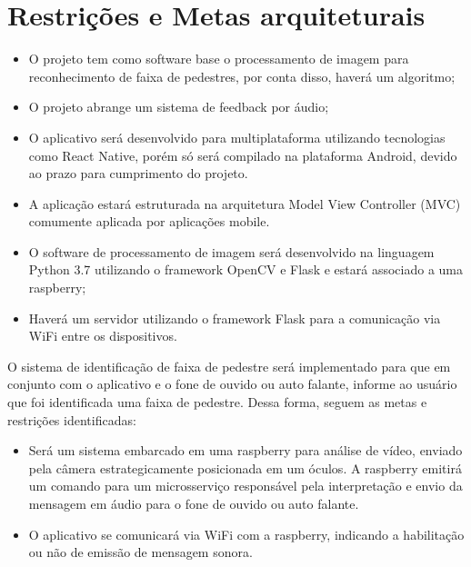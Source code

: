 \section{Restrições e Metas arquiteturais}

\begin{itemize}
    \item O projeto tem como software base o processamento de imagem para reconhecimento de faixa de pedestres, por conta disso, haverá um algoritmo;
    \item O projeto abrange um sistema de feedback por áudio;
    \item O aplicativo será desenvolvido para multiplataforma utilizando tecnologias como React Native, porém só será compilado na plataforma Android, devido ao prazo para cumprimento do projeto.
    \item A aplicação estará estruturada na arquitetura Model View Controller (MVC) comumente aplicada por aplicações mobile.
    \item O software de processamento de imagem será desenvolvido na linguagem Python 3.7 utilizando o framework OpenCV e Flask e estará associado a uma raspberry;
    \item Haverá um servidor utilizando o framework Flask para a comunicação via WiFi entre os dispositivos.
\end{itemize}

O sistema de identificação de faixa de pedestre será implementado para que em conjunto com o aplicativo e o fone de ouvido ou auto falante, informe ao usuário que foi identificada uma faixa de pedestre. Dessa forma, seguem as metas e restrições identificadas:

\begin{itemize}
    \item Será um sistema embarcado em uma raspberry para análise de vídeo, enviado pela câmera estrategicamente posicionada em um óculos.  A raspberry emitirá um comando para um microsserviço responsável pela interpretação e envio da mensagem em áudio para o fone de ouvido ou auto falante.
    \item O aplicativo se comunicará via WiFi com a raspberry, indicando a habilitação ou não de emissão de mensagem sonora.
\end{itemize}